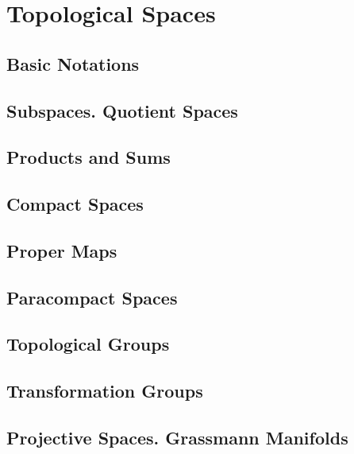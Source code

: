 \chapter{Topological Spaces}

\section{Basic Notations}

\section{Subspaces. Quotient Spaces}

\section{Products and Sums}

\section{Compact Spaces}

\section{Proper Maps}

\section{Paracompact Spaces}

\section{Topological Groups}

\section{Transformation Groups}

\section{Projective Spaces. Grassmann Manifolds}
